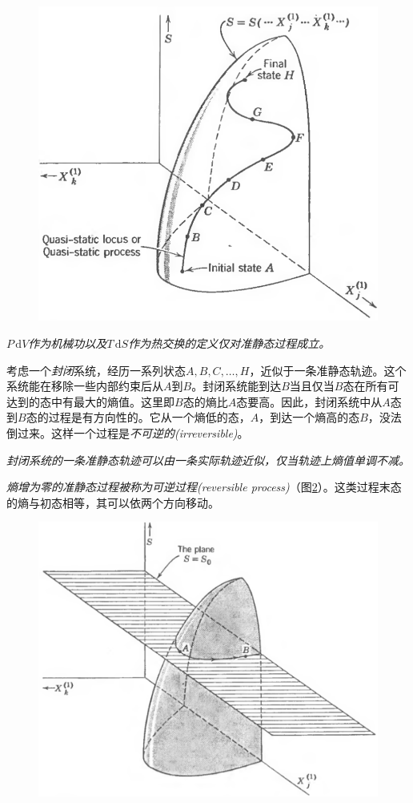 \begin{figure}
\includegraphics[width=.8\textwidth]{Pictures/fig4.3.png}
\label{fig4.3}
\end{figure}

{\it $P\,\mathrm dV$作为机械功以及$T\,\mathrm dS$作为热交换的定义仅对准静态过程成立。}

考虑一个{\it 封闭}系统，经历一系列状态$A,B,C,\dots ,H$，近似于一条准静态轨迹。这个系统能在移除一些内部约束后从$A$到$B$。封闭系统能到达$B$当且仅当$B$态在所有可达到的态中有最大的熵值。这里即$B$态的熵比$A$态要高。因此，封闭系统中从$A$态到$B$态的过程是有方向性的。它从一个熵低的态，$A$，到达一个熵高的态$B$，没法倒过来。这样一个过程是{\it 不可逆的(irreversible)}。

{\it 封闭系统的一条准静态轨迹可以由一条实际轨迹近似，仅当轨迹上熵值单调不减。}

{\it 熵增为零的准静态过程被称为可逆过程(reversible process)}（图\ref{fig4.4}）。这类过程末态的熵与初态相等，其可以依两个方向移动。

\begin{figure}
\includegraphics[width=.8\textwidth]{Pictures/fig4.4.png}
\label{fig4.4}
\end{figure}

